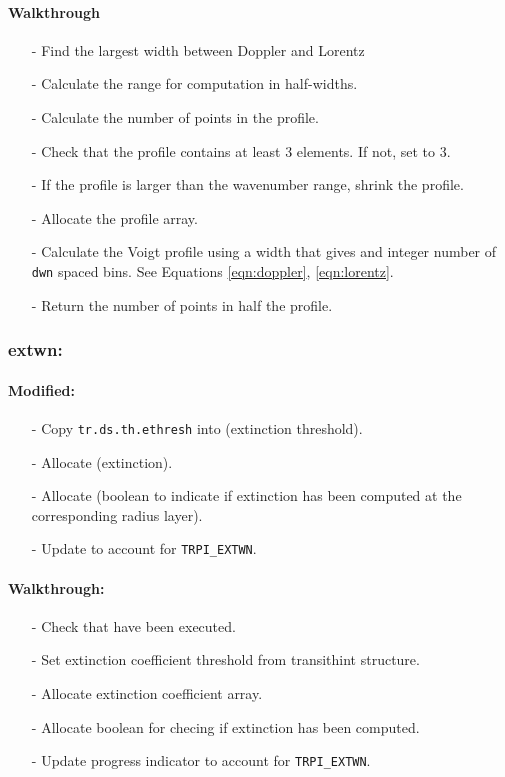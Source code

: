 \documentclass[letterpaper,12pt]{article}
\begin{document}
\paragraph{Walkthrough}
\begin{enumerate}[leftmargin=10pt, noitemsep, parsep=0pt, topsep=0ex]
\item[-] Find the largest width between Doppler and Lorentz
\item[-] Calculate the range for computation in half-widths.
\item[-] Calculate the number of points in the profile.
\item[-] Check that the profile contains at least 3 elements. If not, set to 3.
\item[-] If the profile is larger than the wavenumber range, shrink the profile.
\item[-] Allocate the profile array.
\item[-] Calculate the Voigt profile using a width that gives and integer number of {\tt dwn} spaced bins. See Equations \ref{eqn:doppler}, \ref{eqn:lorentz}.
\item[-] Return the number of points in half the profile.
\end{enumerate}

\subsubsection{extwn:}
\paragraph{Modified:}
\begin{enumerate}[leftmargin=10pt, noitemsep, parsep=0pt, topsep=0ex]
\item[-] Copy {\tt tr.ds.th.ethresh} into  (extinction threshold).
\item[-] Allocate  (extinction).
\item[-] Allocate  (boolean to indicate if extinction has been computed at the corresponding radius layer).
\item[-] Update  to account for {\tt TRPI\_EXTWN}.
\end{enumerate}

\paragraph{Walkthrough:}
\begin{enumerate}[leftmargin=10pt, noitemsep, parsep=0pt, topsep=0ex]
\item[-] Check that  have been executed.
\item[-] Set extinction coefficient threshold from transithint structure.
\item[-] Allocate extinction coefficient array.
\item[-] Allocate boolean for checing if extinction has been computed.
\item[-] Update progress indicator to account for {\tt TRPI\_EXTWN}.
\end{enumerate}
\end{document}

